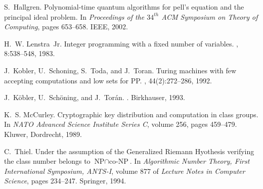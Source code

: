 \documentclass{article}
\theoremstyle{definition}\newtheorem{remark}[theorem]{Remark}
\begin{document}
\begin{thebibliography}{10}
S.~Hallgren.
\newblock Polynomial-time quantum algorithms for pell's equation and the
  principal ideal problem.
\newblock In {\em Proceedings of the $34^{th}$ ACM Symposium on Theory of
  Computing}, pages 653--658. IEEE, 2002.

H.~W. {Lenstra~Jr}.
\newblock Integer programming with a fixed number of variables.
, 8:538--548, 1983.

J.~Kobler, U.~Schoning, S.~Toda, and J.~Toran.
\newblock Turing machines with few accepting computations and low sets for
  {PP}.
, 44(2):272--286, 1992.

J.~K{\"o}bler, U.~Sch{\"o}ning, and J.~Tor{\'a}n.
.
\newblock Birkhauser, 1993.

K.~S. McCurley.
\newblock Cryptographic key distribution and computation in class groups.
\newblock In {\em NATO Advanced Science Institute Series C}, volume 256, pages
  459--479. Kluwer, Dordrecht, 1989.

C.~Thiel.
\newblock Under the assumption of the {Generalized Riemann Hyothesis} verifying
  the class number belongs to $\textrm{NP}\cap \textrm{co-NP}$.
\newblock In {\em Algorithmic Number Theory, First International Symposium,
  ANTS-I}, volume 877 of {\em Lecture Notes in Computer Science}, pages
  234--247. Springer, 1994.

\end{thebibliography}
     
    
\end{document}
